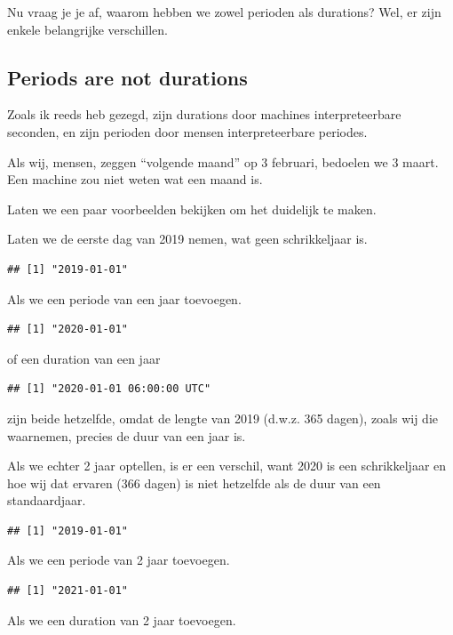 \documentclass[]{tufte-book}
\begin{document}
Nu vraag je je af, waarom hebben we zowel perioden als durations? Wel, er zijn enkele belangrijke verschillen.

\hypertarget{periods-are-not-durations}{%
\subsection{Periods are not durations}\label{periods-are-not-durations}}

Zoals ik reeds heb gezegd, zijn durations door machines interpreteerbare seconden, en zijn perioden door mensen interpreteerbare periodes.

Als wij, mensen, zeggen ``volgende maand'' op 3 februari, bedoelen we 3 maart. Een machine zou niet weten wat een maand is.

Laten we een paar voorbeelden bekijken om het duidelijk te maken.

Laten we de eerste dag van 2019 nemen, wat geen schrikkeljaar is.

\begin{verbatim}
## [1] "2019-01-01"
\end{verbatim}

Als we een periode van een jaar toevoegen.

\begin{verbatim}
## [1] "2020-01-01"
\end{verbatim}

of een duration van een jaar

\begin{verbatim}
## [1] "2020-01-01 06:00:00 UTC"
\end{verbatim}

zijn beide hetzelfde, omdat de lengte van 2019 (d.w.z. 365 dagen), zoals wij die waarnemen, precies de duur van een jaar is.

Als we echter 2 jaar optellen, is er een verschil, want 2020 is een schrikkeljaar en hoe wij dat ervaren (366 dagen) is niet hetzelfde als de duur van een standaardjaar.

\begin{verbatim}
## [1] "2019-01-01"
\end{verbatim}

Als we een periode van 2 jaar toevoegen.

\begin{verbatim}
## [1] "2021-01-01"
\end{verbatim}

Als we een duration van 2 jaar toevoegen.
\end{document}
